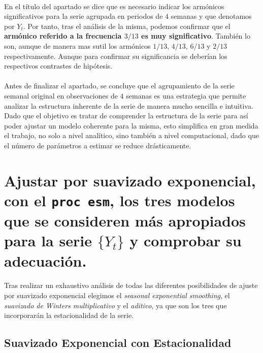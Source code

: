 \documentclass[a4paper, spanish]{article}
\begin{document}
      \paragraph{}
      En el título del apartado se dice que es necesario indicar los armónicos significativos para la serie agrupada en periodos de $4$ semanas y que denotamos por $Y_t$. Por tanto, tras el análisis de la misma, podemos confirmar que el \textbf{armónico referido a la frecuencia $3/13$ es muy significativo}. También lo son, aunque de manera mas sutil los armónicos $1/13$, $4/13$, $6/13$ y $2 / 13$ respectivamente. Aunque para confirmar su significancia se deberían los respectivos contrastes de hipótesis.

    \paragraph{}
    Antes de finalizar el apartado, se concluye que el agrupamiento de la serie semanal original en observaciones de $4$ semanas es una estrategia que permite analizar la estructura inherente de la serie de manera mucho sencilla e intuitiva. Dado que el objetivo es tratar de comprender la estructura de la serie para así poder ajustar un modelo coherente para la misma, esto simplifica en gran medida el trabajo, no solo a nivel analítico, sino también a nivel computacional, dado que el número de parámetros a estimar se reduce drásticamente.

  \section{Ajustar por suavizado exponencial, con el \texttt{proc esm}, los tres modelos que se consideren más apropiados para la serie $\{Y_t\}$ y comprobar su adecuación.}
  \label{sec:b}

    \paragraph{}
    Tras realizar un exhaustivo análisis de todas las diferentes posibilidades de ajuste por suavizado exponencial elegimos el \textit{seasonal exponential smoothing}, el \textit{suavizado de Winters multiplicativo} y el \textit{aditivo}, ya que son los tres que incorporarán la estacionalidad de la serie.

    \subsection{Suavizado Exponencial con Estacionalidad}
\end{document}
